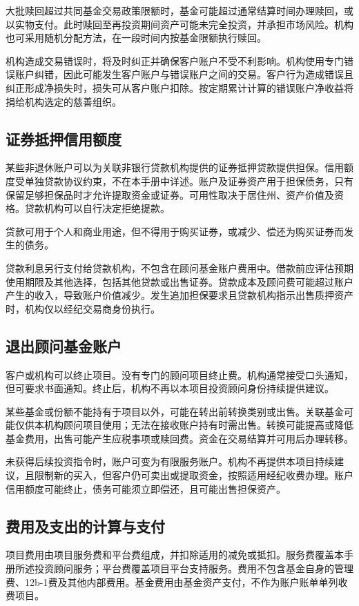 \documentclass[UTF8,fontset=none,11pt,a4paper]{ctexart}
\begin{document}
大批赎回超过共同基金交易政策限额时，基金可能超过通常结算时间办理赎回，或以实物支付。此时赎回至再投资期间资产可能未完全投资，并承担市场风险。机构也可采用随机分配方法，在一段时间内按基金限额执行赎回。


机构造成交易错误时，将及时纠正并确保客户账户不受不利影响。机构使用专门错误账户纠错，因此可能发生客户账户与错误账户之间的交易。客户行为造成错误且纠正形成净损失时，损失可从客户账户扣除。按定期累计计算的错误账户净收益将捐给机构选定的慈善组织。


\subsection*{证券抵押信用额度}
某些非退休账户可以为关联非银行贷款机构提供的证券抵押贷款提供担保。信用额度受单独贷款协议约束，不在本手册中详述。账户及证券资产用于担保债务，只有保留足够担保品时才允许提取资金或证券。可用性取决于居住州、资产价值及资格。贷款机构可以自行决定拒绝提款。


贷款可用于个人和商业用途，但不得用于购买证券，或减少、偿还为购买证券而发生的债务。


贷款利息另行支付给贷款机构，不包含在顾问基金账户费用中。借款前应评估预期使用期限及其他选择，包括其他贷款或出售证券。贷款成本及顾问费可能超过账户产生的收入，导致账户价值减少。发生追加担保要求且贷款机构指示出售质押资产时，机构仅以经纪交易商身份执行。


\subsection*{退出顾问基金账户}
客户或机构可以终止项目。没有专门的顾问项目终止费。机构通常接受口头通知，但可要求书面通知。终止后，机构不再以本项目投资顾问身份持续提供建议。


某些基金或份额不能持有于项目以外，可能在转出前转换类别或出售。关联基金可能仅供本机构顾问项目使用；无法在接收账户持有时需出售。转换可能提高或降低基金费用，出售可能产生应税事项或赎回费。资金在交易结算并可用后办理转移。


未获得后续投资指令时，账户可变为有限服务账户。机构不再提供本项目持续建议，且限制新的买入，但客户仍可卖出或提取资金，按照适用经纪收费办理。账户信用额度可能终止，债务可能须立即偿还，且可能出售担保资产。


\subsection*{费用及支出的计算与支付}
项目费用由项目服务费和平台费组成，并扣除适用的减免或抵扣。服务费覆盖本手册所述投资顾问服务；平台费覆盖项目平台支持服务。费用不包含基金自身的管理费、12b-1费及其他内部费用。基金费用由基金资产支付，不作为账户账单单列收费项目。
\end{document}
